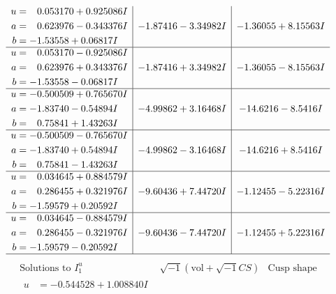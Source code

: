 \documentclass[1p]{elsarticle_modified}
\theoremstyle{definition}
\newcommand{\I}{\sqrt{-1}}
\begin{document}
$$\begin{array}{c|c|c}
\begin{aligned}
u &= \phantom{-}0.053170 + 0.925086 I \\
a &= \phantom{-}0.623976 - 0.343376 I \\
b &= -1.53558 + 0.06817 I\end{aligned}
 & -1.87416 - 3.34982 I & -1.36055 + 8.15563 I \\ \hline\begin{aligned}
u &= \phantom{-}0.053170 - 0.925086 I \\
a &= \phantom{-}0.623976 + 0.343376 I \\
b &= -1.53558 - 0.06817 I\end{aligned}
 & -1.87416 + 3.34982 I & -1.36055 - 8.15563 I \\ \hline\begin{aligned}
u &= -0.500509 + 0.765670 I \\
a &= -1.83740 - 0.54894 I \\
b &= \phantom{-}0.75841 + 1.43263 I\end{aligned}
 & -4.99862 + 3.16468 I & -14.6216 - 8.5416 I \\ \hline\begin{aligned}
u &= -0.500509 - 0.765670 I \\
a &= -1.83740 + 0.54894 I \\
b &= \phantom{-}0.75841 - 1.43263 I\end{aligned}
 & -4.99862 - 3.16468 I & -14.6216 + 8.5416 I \\ \hline\begin{aligned}
u &= \phantom{-}0.034645 + 0.884579 I \\
a &= \phantom{-}0.286455 + 0.321976 I \\
b &= -1.59579 + 0.20592 I\end{aligned}
 & -9.60436 + 7.44720 I & -1.12455 - 5.22316 I \\ \hline\begin{aligned}
u &= \phantom{-}0.034645 - 0.884579 I \\
a &= \phantom{-}0.286455 - 0.321976 I \\
b &= -1.59579 - 0.20592 I\end{aligned}
 & -9.60436 - 7.44720 I & -1.12455 + 5.22316 I\\
 \hline 
 \end{array}$$\newpage$$\begin{array}{c|c|c}  
\text{Solutions to }I^u_{1}& \I (\text{vol} + \sqrt{-1}CS) & \text{Cusp shape}\\
 \hline 
\begin{aligned}
u &= -0.544528 + 1.008840 I \\

\end{aligned}
\end{array}$$
\end{document}
